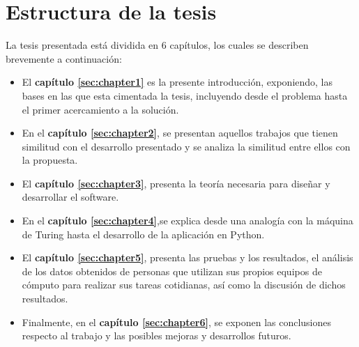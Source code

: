 \section{Estructura de la tesis}

La tesis presentada est\'a dividida en 6 cap\'itulos, los cuales se
 describen brevemente a continuaci\'on:
 
\begin{itemize}

\item {El \textbf{cap\'itulo \ref{sec:chapter1}} es la presente 
 introducci\'on, exponiendo, las bases en las que esta cimentada la tesis, 
 incluyendo desde el problema hasta el primer acercamiento a la soluci\'on.
}

\item { En el \textbf{cap\'itulo \ref{sec:chapter2}}, se presentan aquellos 
 trabajos que tienen similitud con el desarrollo presentado y se analiza la 
 similitud entre ellos con la propuesta.
}

\item { El \textbf{cap\'itulo \ref{sec:chapter3}}, presenta la teor\'ia
 necesaria para dise\~nar y desarrollar el software.
}

\item { En el \textbf{cap\'itulo \ref{sec:chapter4}},se explica
 desde una analog\'ia con la m\'aquina de Turing hasta el desarrollo de la 
 aplicaci\'on en Python.
}

\item { El \textbf{cap\'itulo \ref{sec:chapter5}}, presenta las pruebas y
 los resultados, el an\'alisis de los datos obtenidos de personas que 
 utilizan sus propios equipos de c\'omputo para realizar sus tareas 
 cotidianas, as\'i como la discusi\'on de dichos resultados.
}

\item { Finalmente, en el \textbf{cap\'itulo \ref{sec:chapter6}}, se 
 exponen las conclusiones respecto al trabajo y las posibles mejoras y 
 desarrollos futuros. 
}

\end{itemize}

   